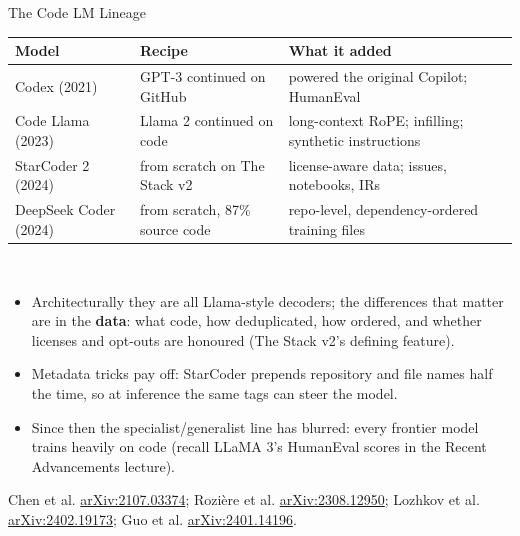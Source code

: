 \begin{frame}{The Code LM Lineage}
  \centering
  {\scriptsize
  \begin{tabular}{lll}
    \toprule
    Model & Recipe & What it added \\
    \midrule
    Codex (2021) & GPT-3 continued on GitHub & powered the original Copilot; HumanEval \\
    Code Llama (2023) & Llama 2 continued on code & long-context RoPE; infilling; synthetic instructions \\
    StarCoder 2 (2024) & from scratch on The Stack v2 & license-aware data; issues, notebooks, IRs \\
    DeepSeek Coder (2024) & from scratch, 87\% source code & repo-level, dependency-ordered training files \\
    \bottomrule
  \end{tabular}}\\[0.7em]
  \begin{itemize}\itemsep0.3em
    \item[\textcolor{red}{$\triangleright$}] Architecturally they are all Llama-style decoders; the
      differences that matter are in the \textbf{data}: what code, how deduplicated, how ordered, and
      whether licenses and opt-outs are honoured (The Stack v2's defining feature).
    \item[\textcolor{red}{$\triangleright$}] Metadata tricks pay off: StarCoder prepends repository and file
      names half the time, so at inference the same tags can steer the model.
    \item[\textcolor{red}{$\triangleright$}] Since then the specialist/generalist line has blurred: every
      frontier model trains heavily on code (recall LLaMA 3's HumanEval scores in the Recent Advancements
      lecture).
  \end{itemize}
  \vspace{0.2em}
  {\scriptsize Chen et al. \href{https://arxiv.org/abs/2107.03374}{arXiv:2107.03374}; Rozi\`ere et al.
  \href{https://arxiv.org/abs/2308.12950}{arXiv:2308.12950}; Lozhkov et al.
  \href{https://arxiv.org/abs/2402.19173}{arXiv:2402.19173}; Guo et al.
  \href{https://arxiv.org/abs/2401.14196}{arXiv:2401.14196}.}
\end{frame}

